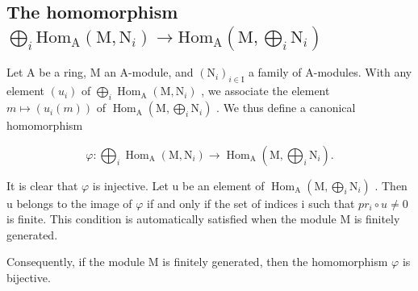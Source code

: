 \subsection{\texorpdfstring{The homomorphism \(\bigoplus_{i} \mathrm{Hom}_{\mathrm{A}}(\mathrm{M}, \mathrm{N}_{i}) \longrightarrow \mathrm{Hom}_{\mathrm{A}}(\mathrm{M}, \bigoplus_{i} \mathrm{N}_{i})\)}{The homomorphism \textbackslash bigoplus\_\{i\} \textbackslash mathrm\{Hom\}\_\{\textbackslash mathrm\{A\}\}(\textbackslash mathrm\{M\}, \textbackslash mathrm\{N\}\_\{i\}) \textbackslash longrightarrow \textbackslash mathrm\{Hom\}\_\{\textbackslash mathrm\{A\}\}(\textbackslash mathrm\{M\}, \textbackslash bigoplus\_\{i\} \textbackslash mathrm\{N\}\_\{i\})}}

Let A be a ring, M an A-module, and \((\mathrm{N}_{i})_{i\in\mathrm{I}}\) a family of A-modules. With any element \((u_{i})\) of \(\bigoplus_{i}\operatorname{Hom}_{\mathrm{A}}(\mathrm{M},\mathrm{N}_{i})\) , we associate the element \(m\mapsto(u_{i}(m))\) of \(\operatorname{Hom}_{\mathrm{A}}(\mathrm{M},\bigoplus_{i}\mathrm{N}_{i})\) . We thus define a canonical homomorphism

\[
\varphi : \bigoplus_ {i} \operatorname{Hom} _ {\mathrm{A}} (\mathrm{M}, \mathrm{N} _ {i}) \longrightarrow \operatorname{Hom} _ {\mathrm{A}} \left(\mathrm{M}, \bigoplus_ {i} \mathrm{N} _ {i}\right).
\]

It is clear that \(\varphi\) is injective. Let u be an element of \(\operatorname{Hom}_{\mathrm{A}}(\mathrm{M},\bigoplus_{i}\mathrm{N}_{i})\) . Then u belongs to the image of \(\varphi\) if and only if the set of indices i such that \(pr_{i}\circ u\neq0\) is finite. This condition is automatically satisfied when the module M is finitely generated.

Consequently, if the module M is finitely generated, then the homomorphism \(\varphi\) is bijective.

